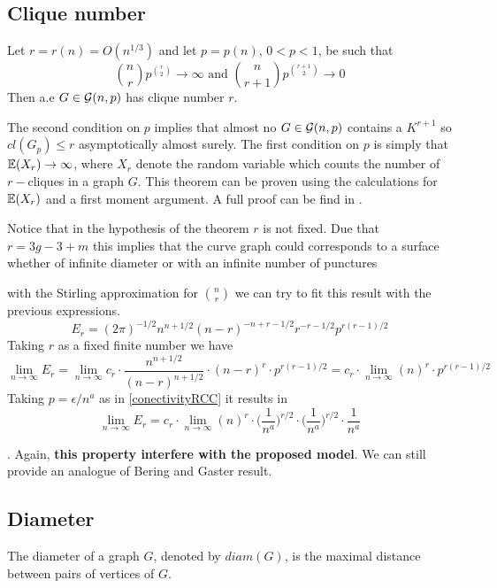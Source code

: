 \subsection{Clique number}

\begin{theorem}
Let $r = r(n) = O(n^{1/3})$ and let $p=p(n)$, $0<p<1$, be such that
$$\binom{n}{r} p^{\binom{r}{2}} \to \infty \text{ and } \binom{n}{r+1} p^{\binom{r+1}{2}} \to 0 $$
Then a.e $G\in\mathcal{G}(n,p)$ has clique number $r$.
\end{theorem}

The second condition on $p$ implies that almost no $G\in\mathcal{G}(n,p)$ contains a $K^{r+1}$ so $cl(G_{p})\leq r$ asymptotically almost surely. The first condition on $p$ is simply that $\mathbb{E} (X_{r}) \to  \infty$, where $X_r$ denote the random variable which counts the number of $r-$cliques in a graph $G$. This theorem can be proven using the calculations for $\mathbb{E}(X_{r})$ and a first moment argument. A full proof can be find in \cite[Bollobás, p.290]{Bollobas}.

Notice that in the hypothesis of the theorem $r$ is not fixed. Due that $r=3g-3+m$ this implies that the curve graph could corresponds to a surface whether of infinite diameter or with an infinite number of punctures

with the Stirling approximation for $\binom{n}{r}$ we can try to fit this result with the previous expressions.
$$E_{r} = (2\pi)^{- 1/2} n^{n+ 1/2} (n - r)^{-n+r-1/2} r^{-r-1/2} p^{r(r- 1)/2}$$
Taking $r$ as a fixed finite number we have
$$\displaystyle\lim_{n\to \infty } E_{r} = \displaystyle\lim_{n\to \infty} c_{r}\cdot \frac{n^{n+1/2}}{(n-r)^{n+1/2}} \cdot (n-r)^{r}\cdot p^{r(r-1)/2} = c_{r}\cdot \displaystyle\lim_{n\to \infty}  (n)^{r}\cdot p^{r(r-1)/2}$$
Taking $p=\epsilon/n^{a}$ as in \ref{conectivityRCC} it results in
$$\displaystyle\lim_{n\to \infty } E_{r} =  c_{r}\cdot \displaystyle\lim_{n\to \infty}  (n)^{r}\cdot\Big(\frac{1}{n^a}\Big)^{r/2}\cdot \Big(\frac{1}{n^a}\Big)^{r/2}
\cdot\frac{1}{n^a}$$



. Again, \textbf{this property interfere with the proposed model}. We can still provide an analogue of Bering and Gaster result.

\subsection{Diameter}

The diameter of a graph $G$, denoted by $diam(G)$, is the maximal distance between pairs of vertices of $G$.

